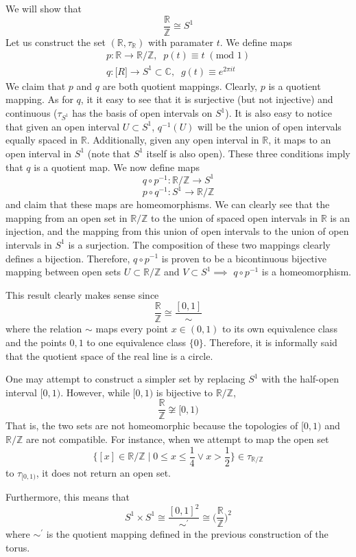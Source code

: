     \begin{example}
    We will show that
    \[\frac{\mathbb{R}}{\mathbb{Z}} \cong S^1\]
    Let us construct the set $(\mathbb{R}, \tau_{\mathbb{R}})$ with paramater $t$. We define maps
    \begin{align*}
    p: \mathbb{R} \longrightarrow \mathbb{R} / \mathbb{Z}, \;\; p(t) \equiv t \; (\text{mod } 1) \\
    q: \mathbb[R] \longrightarrow S^1 \subset \mathbb{C}, \;\; g(t) \equiv e^{2 \pi i t} 
    \end{align*}
    We claim that $p$ and $q$ are both quotient mappings. Clearly, $p$ is a quotient mapping. As for $q$, it it easy to see that it is surjective (but not injective) and continuous ($\tau_{S^1}$ has the basis of open intervals on $S^1$). It is also easy to notice that given an open interval $U \subset S^1$, $q^{-1}(U)$ will be the union of open intervals equally spaced in $\mathbb{R}$. Additionally, given any open interval in $\mathbb{R}$, it maps to an open interval in $S^1$ (note that $S^1$ itself is also open). These three conditions imply that $q$ is a quotient map. We now define maps 
    \[ q \circ p^{-1}: \mathbb{R} / \mathbb{Z} \longrightarrow S^1 \]
    \[ p \circ q^{-1}: S^1 \longrightarrow \mathbb{R} / \mathbb{Z} \]
    and claim that these maps are homeomorphisms. We can clearly see that the mapping from an open set in $\mathbb{R} / \mathbb{Z}$ to the union of spaced open intervals in $\mathbb{R}$ is an injection, and the mapping from this union of open intervals to the union of open intervals in $S^1$ is a surjection. The composition of these two mappings clearly defines a bijection. Therefore, $q \circ p^{-1}$ is proven to be a bicontinuous bijective mapping between open sets $U \subset \mathbb{R} / \mathbb{Z}$ and $V \subset S^1 \implies$ $q \circ p^{-1}$ is a homeomorphism. 

    This result clearly makes sense since 
    \[\frac{\mathbb{R}}{\mathbb{Z}} \cong \frac{[0,1]}{\sim}\]
    where the relation $\sim$ maps every point $x \in (0,1)$ to its own equivalence class and the points $0, 1$ to one equivalence class $\{0\}$. Therefore, it is informally said that the quotient space of the real line is a circle. 

    One may attempt to construct a simpler set by replacing $S^1$ with the half-open interval $[0,1)$. However, while $[0,1)$ is bijective to $\mathbb{R} / \mathbb{Z}$,
    \[\frac{\mathbb{R}}{\mathbb{Z}} \not\cong [0,1)\]
    That is, the two sets are not homeomorphic because the topologies of $[0,1)$ and $\mathbb{R} / \mathbb{Z}$ are not compatible. For instance, when we attempt to map the open set 
    \[ \bigg\{ [x] \in \mathbb{R} / \mathbb{Z} \; | \; 0 \leq x \leq \frac{1}{4} \vee x > \frac{1}{2} \bigg\} \in \tau_{\mathbb{R} / \mathbb{Z}} \]
    to $\tau_{[0,1)}$, it does not return an open set. 


    Furthermore, this means that
    \[S^1 \times S^1 \cong \frac{[0,1]^2}{\sim^\prime} \cong \bigg( \frac{\mathbb{R}}{\mathbb{Z}} \bigg)^2\]
    where $\sim^\prime$ is the quotient mapping defined in the previous construction of the torus. 
    \end{example}

